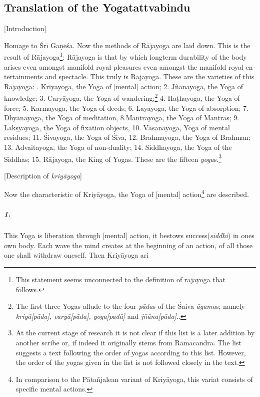 \begin{otherlanguage}{english}
\chapter{Translation of the Yogatattvabindu}    
\centerline{\textrm{\small{[Introduction]}}}
\bigskip
\begin{tlate}
Homage to Śrī Gaṇeśa. Now the methods of Rājayoga are laid down. This is the result of Rājayoga\footnote{This statement seems unconnected to the definition of rājayoga that follows.}: Rājayoga is that by which longterm durability of the body arises even amongst manifold royal pleasures even amongst the manifold royal entertainments and spectacle. This truly is Rājayoga. These are the varieties of this Rājayoga:
. Kriyāyoga, the Yoga of [mental] action; 2. Jñānayoga, the Yoga of knowledge; 3. Caryāyoga, the Yoga of wandering;\footnote{The first three Yogas allude to the four \textit{pāda}s of the Śaiva \textit{āgama}s; namely \textit{kriyā[pāda], caryā[pāda], yoga[padā]} and \textit{jñāna[pāda]}.\parencite[77]{nishvasa2015}.} 4. Haṭhayoga, the Yoga of force; 5. Karmayoga, the Yoga of deeds; 6. Layayoga, the Yoga of absorption; 7. Dhyānayoga, the Yoga of meditation, 8.Mantrayoga, the Yoga of Mantras; 9. Lakṣyayoga, the Yoga of fixation objects, 10. Vāsanāyoga, Yoga of mental residues; 11. Śivayoga, the Yoga of Śiva, 12. Brahmayoga, the Yoga of Brahman; 13. Advaitayoga, the Yoga of non-duality; 14. Siddhayoga, the Yoga of the Siddhas; 15. Rājayoga, the King of Yogas. These are the fifteen \textit{yoga}s.\footnote{At the current stage of research it is not clear if this list is a later addition by another scribe or, if indeed it originally stems from Rāmacandra. The list suggests a text following the order of yogas according to this list. However, the order of the yogas given in the list is not followed closely in the text.}
\end{tlate}
 \begin{tlate}
      \centerline{\textrm{\small{[Description of \textit{kriyāyoga}]}}}
      \bigskip
Now the characteristic of Kriyāyoga, the Yoga of [mental] action\footnote{In comparison to the Pātañjalean variant of Kriyāyoga, this variat consists of specific mental actions.} are described.
\paragraph{1.} This Yoga is liberation through [mental] action, it bestows success(\textit{siddhi}) in ones own body. Each wave the mind creates at the beginning of an action, of all those one shall withdraw oneself. Then Kriyāyoga ari

\end{tlate}
\end{otherlanguage}
